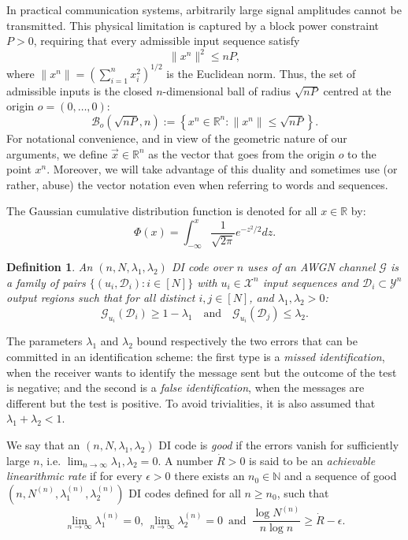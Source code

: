 \documentclass[10pt,conference]{IEEEtran}
\newtheorem{definition}[theorem]{Definition}
\newcommand{\1}{\mathds{1}}
\newcommand{\RR}{\mathbb{R}}
\newcommand{\cD}{\mathcal{D}}
\newcommand{\cG}{\mathcal{G}}
\newcommand{\cX}{\mathcal{X}}
\newcommand{\cY}{\mathcal{Y}}
\begin{document}
In practical communication systems, arbitrarily large signal amplitudes 
cannot be transmitted. This physical limitation is captured by a block 
power constraint $P>0$, requiring that every admissible input sequence 
satisfy
\begin{equation}\label{eq:power_constraint}
\|x^n\|^2 \le nP,
\end{equation}
where $\|x^n\| = \left(\sum_{i=1}^n x_i^2\right)^{1/2}$ is the Euclidean norm. 
Thus, the set of admissible inputs is the closed $n$-dimensional ball of radius $\sqrt{nP}$ centred at the origin $o=(0,\dots,0)$:
\begin{equation}
\mathcal{B}_{o}(\sqrt{nP},n) 
:= \left\{ x^n \in \mathbb{R}^n : \|x^n\| \leq \sqrt{nP} \right\}. 
\end{equation}
%
For notational convenience, and in view of the geometric nature of our 
arguments, we define $\vec{x}\in\mathbb{R}^n$ as the vector that goes from the origin $o$ to the point $x^n$. Moreover, we will take advantage of this duality and sometimes use (or rather, abuse) the vector notation even when referring to words and sequences.

The Gaussian cumulative distribution function is denoted for all $x\in\RR$ by:
\begin{equation}\label{eq:comulative}
    \Phi(x)=\int_{-\infty}^x\frac{1}{\sqrt{2\pi}}e^{-z^2/2}dz.
\end{equation}

\begin{definition}\label{def:DI_code}
An $(n,N,\lambda_1,\lambda_2)$ DI code over $n$ uses of an AWGN channel $\cG$ is a family of pairs $\{(u_i,\cD_i) : i\in[N]\}$ with $u_i\in\cX^n$ input sequences and $\cD_i\subset\cY^n$ output regions such that for all distinct $i, j\in [N]$, and $\lambda_1,\lambda_2>0$:
\[
  \cG_{u_i}(\cD_i)\ge 1-\lambda_1 \quad\text{and}\quad \cG_{u_i}(\cD_j)\le\lambda_2.
\]
\end{definition}

The parameters $\lambda_1$ and $\lambda_2$ bound respectively the two errors that can be committed in an identification scheme: the first type is a \emph{missed identification}, when the receiver wants to identify the message sent but the outcome of the test is negative; and the second is a \emph{false identification}, when the messages are different but the test is positive. To avoid trivialities, it is also assumed that $\lambda_1+\lambda_2<1$.

We say that an $(n,N,\lambda_1,\lambda_2)$ DI code is \emph{good} if the errors vanish for sufficiently large $n$, i.e. $\lim_{n\to\infty}\lambda_1,\lambda_2 = 0$.
A number $\dot{R}> 0$ is said to be an \emph{achievable linearithmic rate} if for every $\epsilon>0$
there exists an $n_0\in\mathbb{N}$ and a sequence of good
$(n,N^{(n)},\lambda_1^{(n)},\lambda_2^{(n)})$ DI codes defined for all $n\ge n_0$, 
such that
\begin{equation}
\lim_{n\to\infty}\lambda_1^{(n)} = 0,
\,
\lim_{n\to\infty}\lambda_2^{(n)}=0\,\,\, \text{and}\,\,\,\frac{\log N^{(n)}}{n\log n} \ge \dot{R}-\epsilon.
\end{equation}
\end{document}
